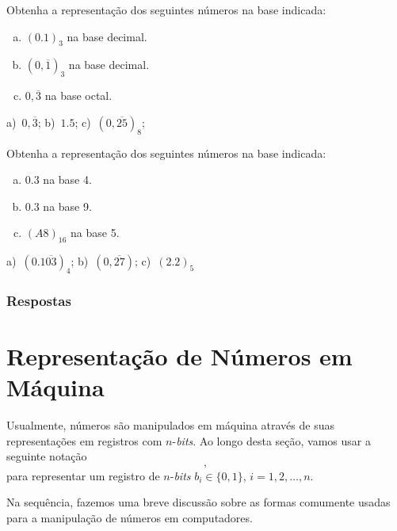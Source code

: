 \begin{exer}
  Obtenha a representação dos seguintes números na base indicada:
  \begin{enumerate}[a)]
  \item $(0.1)_3$ na base decimal.
  \item $(0,\overline{1})_3$ na base decimal.
  \item $0,\overline{3}$ na base octal.
  \end{enumerate}
\end{exer}
\begin{resp}
  a)~$0,\overline{3}$; b)~$1.5$; c)~$(0,\overline{25})_8$;
\end{resp}

\begin{exer}
  Obtenha a representação dos seguintes números na base indicada:
  \begin{enumerate}[a)]
  \item $0.3$ na base 4.
  \item $0.3$ na base 9.
  \item $(A8)_{16}$ na base 5.
  \end{enumerate}
\end{exer}
\begin{resp}
  a)~$(0.1\overline{03})_4$; b)~$(0,\overline{27})$; c)~$(2.2)_5$
\end{resp}

\ifisbook
\subsubsection{Respostas}
\shipoutAnswer
\fi


\section{Representação de Números em Máquina}\label{cap_artm_sec_repummaq}

Usualmente, números são manipulados em máquina através de suas representações em registros com $n$-{\it bits}. Ao longo desta seção, vamos usar a seguinte notação
\begin{equation}
  [b_1 ~ b_2 ~ b_3 ~ \cdots ~ b_n],
\end{equation}
para representar um registro de $n$-{\it bits} $b_i\in\{0, 1\}$, $i=1, 2, \dotsc, n$.

Na sequência, fazemos uma breve discussão sobre as formas comumente usadas para a manipulação de números em computadores.


